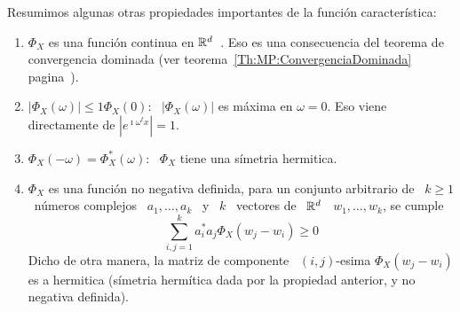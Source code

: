 Resumimos algunas otras propiedades importantes de la funci\'on caracter\'istica:
%
\begin{enumerate}
\item\label{Prop:MP:ContinuidadPhiX}  $\Phi_X$  es  una  funci\'on  continua  en
  $\mathbb{R}^d$~\cite[Prop.~5.2.1]{Pin09}.  Eso es una  consecuencia del  teorema de
  convergencia     dominada     (ver    teorema~\ref{Th:MP:ConvergenciaDominada}
  pagina~\pageref{Th:MP:ConvergenciaDominada}).
%
\item\label{Prop:MP:MaximoPhiX} $\left| \Phi_X(\omega) \right| \le 1 \Phi_X(0)$:
  \  $\left| \Phi_X(\omega)  \right|$ es  m\'axima en  $\omega =  0$.  Eso viene
  directamente de $\left| e^{\imath \omega^t x} \right| = 1$.
%
\item\label{Prop:MP:HermiticaPhiX}   $\Phi_X(-\omega)  =   \Phi_X^*(\omega)$:  \
  $\Phi_X$ tiene una s\'imetria hermitica.
%
\item  $\Phi_X$ es  una funci\'on  no negativa  definida, \ie  para  un conjunto
  arbitrario de \ $k  \ge 1$ \ n\'umeros complejos \ $a_1 , \ldots  , a_k$ \ y \
  $k$ \ vectores de \ $\mathbb{R}^d$ \ $w_1 , \ldots , w_k$, se cumple
  \[
  \sum_{i,j=1}^k a_i^* a_j \Phi_X(w_j-w_i) \ge 0
  \]
  Dicho   de   otra   manera,   la   matriz  de   componente   \   $(i,j)$-esima
  $\Phi_X(w_j-w_i)$ es a hermitica (s\'imetria herm\'itica dada por la propiedad
  anterior, y no negativa definida).
%
\end{enumerate}





